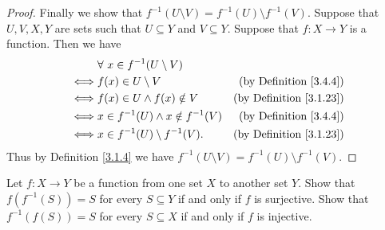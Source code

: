 \begin{proof}
    Finally we show that \(f^{-1}(U \setminus V) = f^{-1}(U) \setminus f^{-1}(V)\).
    Suppose that \(U, V, X, Y\) are sets such that \(U \subseteq Y\) and \(V \subseteq Y\).
    Suppose that \(f : X \to Y\) is a function.
    Then we have
    \begin{align*}
             & \forall\ x \in f^{-1}(U \setminus V)                                           \\
        \iff & f(x) \in U \setminus V                   & \text{(by Definition \ref{3.4.4})}  \\
        \iff & f(x) \in U \land f(x) \notin V           & \text{(by Definition \ref{3.1.23})} \\
        \iff & x \in f^{-1}(U) \land x \notin f^{-1}(V) & \text{(by Definition \ref{3.4.4})}  \\
        \iff & x \in f^{-1}(U) \setminus f^{-1}(V).     & \text{(by Definition \ref{3.1.23})}
    \end{align*}
    Thus by Definition \ref{3.1.4} we have \(f^{-1}(U \setminus V) = f^{-1}(U) \setminus f^{-1}(V)\).
\end{proof}

\begin{exercise}\label{ex 3.4.5}
    Let \(f : X \to Y\) be a function from one set \(X\) to another set \(Y\).
    Show that \(f(f^{-1}(S)) = S\) for every \(S \subseteq Y\) if and only if \(f\) is surjective.
    Show that \(f^{-1}(f(S)) = S\) for every \(S \subseteq X\) if and only if \(f\) is injective.
\end{exercise}

